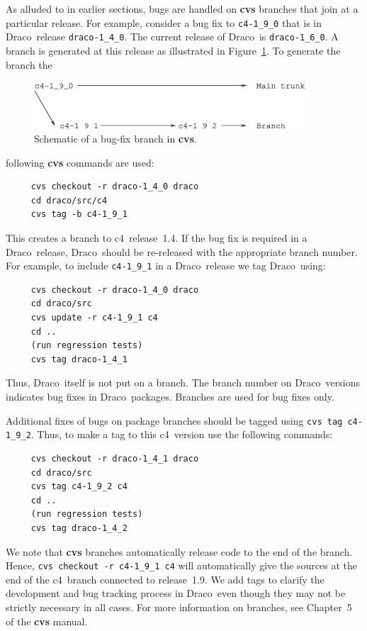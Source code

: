 \documentclass[11pt]{nmemo}
\newcommand{\draco}{{\normalfont\normalsize\sffamily Draco}}
\newcommand{\cfour}{{\normalfont\normalsize\sffamily c\footnotesize 4}}
\newcommand{\stable}{{\normalfont\normalsize\ttfamily last\_stable}}
\begin{document}
As alluded to in earlier sections, bugs are handled on {\bf cvs}
branches that join at a particular release.  For example, consider a
bug fix to \texttt{c4-1\_9\_0} that is in \draco\ release
\texttt{draco-1\_4\_0}.  The current release of \draco\ is
\texttt{draco-1\_6\_0}.  A branch is generated at this release as
illustrated in Figure~\ref{fig:branch}.  To generate the branch the
\begin{figure}
  \centerline{\includegraphics[width=4in]{branch.eps}}
  \caption{Schematic of a bug-fix branch in {\bf cvs}.}
  \label{fig:branch}
\end{figure}
following {\bf cvs} commands are used:
\begin{verbatim}
     cvs checkout -r draco-1_4_0 draco
     cd draco/src/c4
     cvs tag -b c4-1_9_1
\end{verbatim}
This creates a branch to \cfour\ release~1.4.  If the bug fix is
required in a \draco\ release, \draco\ should be re-released with the
appropriate branch number.  For example, to include
\texttt{c4-1\_9\_1} in a \draco\ release we tag \draco\ using:
\begin{verbatim}
     cvs checkout -r draco-1_4_0 draco
     cd draco/src
     cvs update -r c4-1_9_1 c4
     cd ..
     (run regression tests)
     cvs tag draco-1_4_1
\end{verbatim}
Thus, \draco\ itself is not put on a branch.  The branch number on
\draco\ versions indicates bug fixes in \draco\ packages.  %
Branches are used for bug fixes only.  %

Additional fixes of bugs on package branches should be tagged using
\texttt{cvs tag c4-1\_9\_2}.  Thus, to make a tag to this \cfour\ 
version use the following commands:
\begin{verbatim}
     cvs checkout -r draco-1_4_1 draco
     cd draco/src
     cvs tag c4-1_9_2 c4
     cd ..
     (run regression tests)
     cvs tag draco-1_4_2
\end{verbatim}
We note that {\bf cvs} branches automatically release code to the end
of the branch.  Hence, \texttt{cvs checkout -r c4-1\_9\_1 c4} will
automatically give the sources at the end of the \cfour\ branch
connected to release~1.9.  We add tags to clarify the development and
bug tracking process in \draco\ even though they may not be strictly
necessary in all cases.  For more information on branches, see
Chapter~5 of the {\bf cvs} manual.
\end{document}
